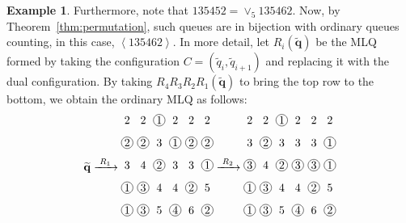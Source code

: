 \documentclass[reqno]{amsart}
\newcommand{\0}{\phantom{c}}
\newcommand{\swt}[1]{\left\langle #1 \right\rangle} %
\newcommand{\merge}[1]{\vee_{#1}} %
\newcommand{\qq}{\mathbf{q}}
\theoremstyle{plain}
\theoremstyle{definition}
\newtheorem{example}[thm]{Example}
\numberwithin{equation}{section}
\begin{document}
\begin{example}
Furthermore, note that $135452 = \merge{5} 135462$.
Now, by Theorem~\ref{thm:permutation}, such queues are in bijection with ordinary queues counting, in this case, $\swt{135462}$.
In more detail, let $R_i(\widetilde{\qq})$ be the MLQ formed by taking the configuration $C = (\widetilde{q}_i, \widetilde{q}_{i+1})$ and replacing it with the dual configuration.
By taking $R_4 R_3 R_2 R_1(\widetilde{\qq})$ to bring the top row to the bottom, we obtain the ordinary MLQ as follows:
\[
\widetilde{\qq} \xrightarrow[\hspace{15pt}]{R_1}
\begin{tikzpicture}[xscale=0.5,yscale=0.7,every node/.style={inner sep=0.8pt},baseline=55]
\node at (0, 5){2};\node at (1, 5){2};\node[circle, draw=black] at (2, 5){1};\node at (3, 5){2};\node at (4, 5){2};\node at (5, 5){2};\node[circle, draw=black] at (0, 4){2};\node[circle, draw=black] at (1, 4){2};\node at (2, 4){3};\node[circle, draw=black] at (3, 4){1};\node[circle, draw=black] at (4, 4){2};\node[circle, draw=black] at (5, 4){2};\node at (0, 3){3};\node at (1, 3){4};\node[circle, draw=black] at (2, 3){2};\node at (3, 3){3};\node at (4, 3){3};\node[circle, draw=black] at (5, 3){1};\node[circle, draw=black] at (0, 2){1};\node[circle, draw=black] at (1, 2){3};\node at (2, 2){4};\node at (3, 2){4};\node[circle, draw=black] at (4, 2){2};\node at (5, 2){5};\node[circle, draw=black] at (0, 1){1};\node[circle, draw=black] at (1, 1){3};\node at (2, 1){5};\node[circle, draw=black] at (3, 1){4};\node at (4, 1){6};\node[circle, draw=black] at (5, 1){2};
\end{tikzpicture}
\xrightarrow[\hspace{15pt}]{R_2}
\begin{tikzpicture}[xscale=0.5,yscale=0.7,every node/.style={inner sep=0.8pt},baseline=55]
\node at (0, 5){2};\node at (1, 5){2};\node[circle, draw=black] at (2, 5){1};\node at (3, 5){2};\node at (4, 5){2};\node at (5, 5){2};\node at (0, 4){3};\node[circle, draw=black] at (1, 4){2};\node at (2, 4){3};\node at (3, 4){3};\node at (4, 4){3};\node[circle, draw=black] at (5, 4){1};\node[circle, draw=black] at (0, 3){3};\node at (1, 3){4};\node[circle, draw=black] at (2, 3){2};\node[circle, draw=black] at (3, 3){3};\node[circle, draw=black] at (4, 3){3};\node[circle, draw=black] at (5, 3){1};\node[circle, draw=black] at (0, 2){1};\node[circle, draw=black] at (1, 2){3};\node at (2, 2){4};\node at (3, 2){4};\node[circle, draw=black] at (4, 2){2};\node at (5, 2){5};\node[circle, draw=black] at (0, 1){1};\node[circle, draw=black] at (1, 1){3};\node at (2, 1){5};\node[circle, draw=black] at (3, 1){4};\node at (4, 1){6};\node[circle, draw=black] at (5, 1){2};

\end{tikzpicture}\]
\end{example}
\end{document}
